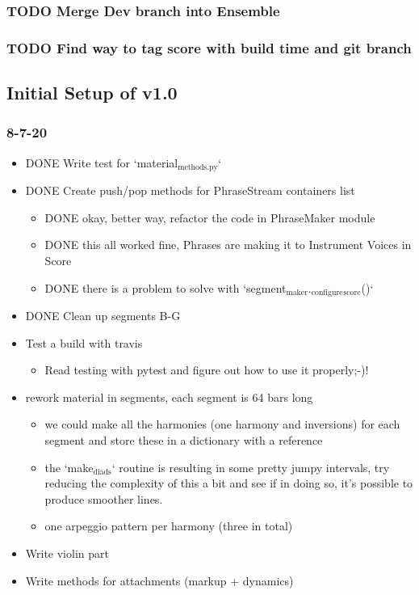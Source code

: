 \documentclass[11pt]{article}
\begin{document}
\subsubsection*{{\bfseries\sffamily TODO} Merge Dev branch into Ensemble}
\label{sec:org02d3568}

\subsubsection*{{\bfseries\sffamily TODO} Find way to tag score with build time and git branch}
\label{sec:org0725120}


\subsection*{Initial Setup of v1.0}
\label{sec:org5d0b7ea}

\subsubsection*{8-7-20}
\label{sec:org24ceabb}

\begin{itemize}
\item DONE Write test for `material\(_{\text{methods.py}}\)`
\item DONE Create push/pop methods for PhraseStream containers list
\begin{itemize}
\item DONE okay, better way, refactor the code in  PhraseMaker module
\item DONE this all worked fine, Phrases are making it to Instrument Voices in
Score
\item DONE there is a problem to solve with `segment\(_{\text{maker}}\).\(_{\text{configure}}\)\(_{\text{score}}\)()`
\end{itemize}
\item DONE Clean up segments B-G

\item Test a build with travis
\begin{itemize}
\item Read testing with pytest and figure out how to use it properly;-)!
\end{itemize}

\item rework material in segments, each segment is 64 bars long
\begin{itemize}
\item we could make all the harmonies (one harmony and inversions) for each
segment and store these in a dictionary with a reference
\item the `make\(_{\text{diads}}\)` routine is resulting in some pretty jumpy intervals, try
reducing the complexity of this a bit and see if in doing so, it's possible
to produce smoother lines.
\item one arpeggio pattern per harmony (three in total)
\end{itemize}

\item Write violin part

\item Write methods for attachments (markup + dynamics)
\end{itemize}
\end{document}
